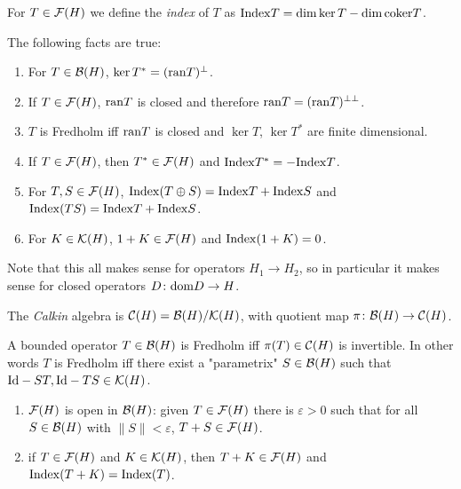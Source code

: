\begin{definition}
 For $T\in\mathcal{F}(H)$ we define the \emph{index} of $T$ as $\mathrm{Index} T=\dim\ker T-\dim\mathrm{coker} T$.
\end{definition}
\begin{fact}
 The following facts are true: 
 \begin{enumerate}
  \item For $T\in\mathcal{B}(H)$, $\ker T^\ast=(\mathrm{ran} T)^\perp$.
  \item If $T\in\mathcal{F}(H)$, $\mathrm{ran} T$ is closed and therefore $\mathrm{ran} T=(\mathrm{ran} T)^{\perp\perp}$.
  \item $T$ is Fredholm iff $\mathrm{ran} T$ is closed and $\ker T$, $\ker T^\ast$ are finite dimensional.
  \item If $T\in\mathcal{F}(H)$, then $T^\ast\in\mathcal{F}(H)$ and $\mathrm{Index} T^\ast=-\mathrm{Index} T$.
  \item For $T,S\in\mathcal{F}(H)$, $\mathrm{Index} (T\oplus S)=\mathrm{Index} T+\mathrm{Index} S$ and $\mathrm{Index}(TS)=\mathrm{Index} T+\mathrm{Index} S$.
  \item For $K\in \mathcal{K}(H)$, $1+K\in\mathcal{F}(H)$ and $\mathrm{Index}(1+K)=0$.
 \end{enumerate}
\end{fact}

\noindent Note that this all makes sense for operators $H_1\to H_2$, so in particular it makes sense for closed operators $D\colon\mathrm{dom} D\to H$.

\begin{definition}
 The \emph{Calkin} algebra is $\mathcal{C}(H)=\mathcal{B}(H)/\mathcal{K}(H)$, with quotient map $\pi\colon\mathcal{B}(H)\to\mathcal{C}(H)$.
\end{definition}

\begin{theorem}[Atkinson]
 A bounded operator $T\in\mathcal{B}(H)$ is Fredholm iff $\pi(T)\in\mathcal{C}(H)$ is invertible. In other words $T$ is Fredholm iff there exist a "parametrix" $S\in\mathcal{B}(H)$ such that $\mathrm{Id}-ST,\mathrm{Id}-TS\in\mathcal{K}(H)$. 
\end{theorem}

\begin{corollary}\noindent
 \begin{enumerate}
  \item $\mathcal{F}(H)$ is open in $\mathcal{B}(H)$: given $T\in\mathcal{F}(H)$ there is $\varepsilon>0$ such that for all $S\in\mathcal{B}(H)$ with $\|S\|<\varepsilon$, $T+S\in\mathcal{F}(H)$.
  \item if $T\in\mathcal{F}(H)$ and $K\in\mathcal{K}(H)$, then $T+K\in\mathcal{F}(H)$ and $\mathrm{Index}(T+K)=\mathrm{Index}(T)$.
 \end{enumerate}
\end{corollary}

